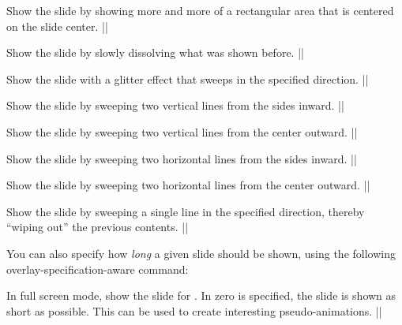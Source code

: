 \begin{command}{\transboxout{}}
  Show the slide by showing more and more of a rectangular area that
  is centered on the slide center.
  \example|\transboxout|
\end{command}

\begin{command}{\transdissolve{}}
  Show the slide by slowly dissolving what was shown before.
  \example|\transdissolve[duration=0.2]|
\end{command}

\begin{command}{\transglitter{}}
  Show the slide with a glitter effect that sweeps in the specified
  direction.
  \example||
\end{command}

\begin{command}{\transsplitverticalin{}}
  Show the slide by sweeping two vertical lines from the sides inward.
  \example|\transsplitverticalin|
\end{command}

\begin{command}{\transsplitverticalout{}}
  Show the slide by sweeping two vertical lines from the center outward.
  \example|\transsplitverticalout|
\end{command}

\begin{command}{\transsplithorizontalin{}}
  Show the slide by sweeping two horizontal lines from the sides inward.
  \example|\transsplithorizontalin|
\end{command}

\begin{command}{\transsplithorizontalout{}}
  Show the slide by sweeping two horizontal lines from the center outward.
  \example|\transsplithorizontalout|
\end{command}

\begin{command}{\transwipe{}}
  Show the slide by sweeping a single line in the specified direction,
  thereby ``wiping out'' the previous contents.
  \example|\transwipe[direction=90]|
\end{command}


You can also specify how \emph{long} a given slide should be shown,
using the following overlay-specification-aware command:

\begin{command}{\transduration{}}
  In full screen mode, show the slide for .
  In zero is specified, the slide is shown as short as possible. This
  can be used to create interesting pseudo-animations.
  \example||
\end{command}




